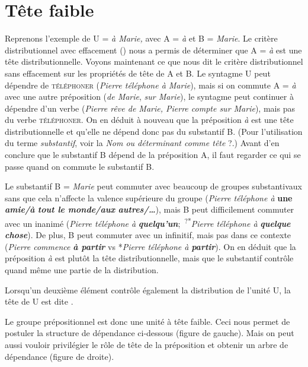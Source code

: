 \section{ Tête faible}\label{sec:3.3.14}

Reprenons l’exemple de U = \textit{à Marie,} avec A = \textit{à} et B = \textit{Marie}. Le critère distributionnel avec effacement () nous a permis de déterminer que A = \textit{à} est une tête distributionnelle. Voyons maintenant ce que nous dit le critère distributionnel sans effacement sur les propriétés de tête de A et B. Le syntagme U peut dépendre de \textsc{téléphoner} (\textit{Pierre téléphone à Marie}), mais si on commute A = \textit{à} avec une autre préposition (\textit{de Marie}, \textit{sur Marie}), le syntagme peut continuer à dépendre d’un verbe (\textit{Pierre rêve de Marie, Pierre compte sur Marie}), mais pas du verbe \textsc{téléphoner}. On en déduit à nouveau que la préposition \textit{à} est une tête distributionnelle et qu’elle ne dépend donc pas du substantif B. (Pour l’utilisation du terme \textit{substantif}, voir la  \textit{Nom ou déterminant comme tête} ?.) Avant d’en conclure que le substantif B dépend de la préposition A, il faut regarder ce qui se passe quand on commute le substantif B.

Le substantif B = \textit{Marie} peut commuter avec beaucoup de groupes substantivaux sans que cela n’affecte la valence supérieure du groupe (\textit{Pierre téléphone à}\textbf{ \textbf{une} \textit{amie/à} \textit{tout le monde/aux} \textit{autres/…}}), mais B peut difficilement commuter avec un inanimé (\textit{Pierre téléphone à} \textbf{\textit{quelqu’un}};~\textsuperscript{?*}\textit{Pierre téléphone à} \textbf{\textit{quelque chose}}). De plus, B peut commuter avec un infinitif, mais pas dans ce contexte (\textit{Pierre commence} \textbf{\textit{à partir}} vs *\textit{Pierre téléphone à} \textbf{\textit{partir}}). On en déduit que la préposition \textit{à} est plutôt la tête distributionnelle, mais que le substantif contrôle quand même une partie de la distribution.

\begin{styleLivreImportant}
Lorsqu’un deuxième élément contrôle également la distribution de l’unité U, la tête de U est dite .
\end{styleLivreImportant}

Le groupe prépositionnel est donc une unité à tête faible. Ceci nous permet de postuler la structure de dépendance ci-dessous (figure de gauche). Mais on peut aussi vouloir privilégier le rôle de tête de la préposition et obtenir un arbre de dépendance (figure de droite).

